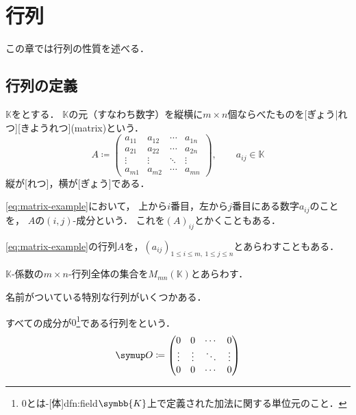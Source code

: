 \documentclass[../sotsu.tex]{subfiles}
\begin{document}
\section{行列}
\label{sec:matrix}

この章では行列の性質を述べる．

\subsection{行列の定義}

\begin{definition}[行列]
    $𝕂$をとする．
    $𝕂$の元（すなわち数字）を縦横に$m \times n$個ならべたものを[ぎょう|れつ][きようれつ](matrix)という．
    \begin{equation}
        \label{eq:matrix-example}
        A \coloneq 
        \begin{pmatrix}
            a_{11}  &  a_{12}  &  \cdots  &  a_{1n}  \\
            a_{21}  &  a_{22}  &  \cdots  &  a_{2n}  \\
            \vdots  &  \vdots  &  \ddots  &  \vdots  \\
            a_{m1}  &  a_{m2}  &  \cdots  &  a_{mn}
        \end{pmatrix}
        , \qquad 
        a_{ij} \in 𝕂
    \end{equation}
    縦が[れつ]，横が[ぎょう]である．

    \cref{eq:matrix-example}において，
    上から$i$番目，左から$j$番目にある数字$a_{ij}$のことを，
    $A$の$(i, j)$-成分という．
    これを$(A)_{ij}$とかくこともある．
\end{definition}

\cref{eq:matrix-example}の行列$A$を，$(a_{ij})_{1 \leq i \leq m, \  1 \leq j \leq n}$とあらわすこともある．

\begin{definition}
    \label{dfn:set-of-matrix}
    $𝕂$-係数の$m \times n$-行列全体の集合を$M_{mn}(𝕂)$とあらわす．
\end{definition}

名前がついている特別な行列がいくつかある．

\begin{definition}
    すべての成分が$0$\footnote{
        $0$とは-[体]{dfn:field}$\symbb{K}$上で定義された加法に関する単位元のこと．
    }である行列をという．
    \begin{equation}
        \zmat \coloneq 
        \begin{pmatrix}
            0      & 0      & \cdots & 0      \\
            \vdots & \vdots & \ddots & \vdots \\
            0      & 0      & \cdots & 0
        \end{pmatrix}
    \end{equation}
\end{definition}
\end{document}
